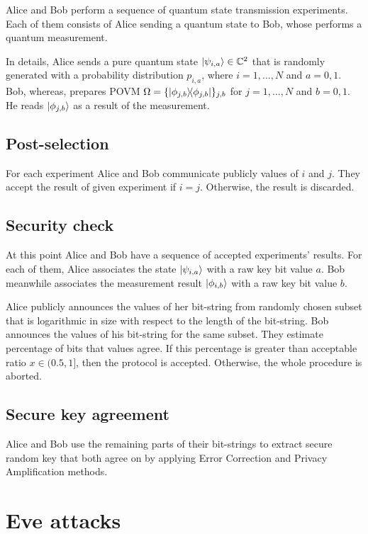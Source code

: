 \documentclass[12pt,a4paper,reqno, aps, superscriptaddress]{amsart}
\newcommand{\C}{\ensuremath{\mathbb{C}}}
\newcommand{\proj}[1]{\ensuremath{\ketbra{#1}{#1}}}
\begin{document}
Alice and Bob perform a sequence of quantum state transmission experiments. 
Each of them consists of Alice sending a quantum state to Bob, whose performs a 
quantum measurement. 

In details, Alice sends a pure quantum state $\ket{\psi_{i,a}} \in \C^2$ that 
is 
randomly generated with a probability distribution $p_{i,a}$, where 
$i=1,\ldots,N$ and $a=0,1$. Bob, whereas, prepares POVM $\Omega = 
\{\proj{\phi_{j,b}}\}_{j,b}$ for $j=1,\ldots,N$ 
and $b=0,1$. He reads $\ket{\phi_{j,b}}$ as a result of the measurement.

\subsection{Post-selection}

For each experiment Alice and Bob communicate publicly values of $i$ and $j$. 
They accept the result of given experiment if $i=j$. Otherwise, the result is 
discarded. 

\subsection{Security check}
At this point Alice and Bob have a sequence of accepted experiments' results. 
For each of them, Alice associates the state $\ket{\psi_{i,a}}$ with a raw key 
bit 
value $a$. Bob meanwhile associates the measurement result $\ket{\phi_{i,b}}$ 
with a 
raw key bit value $b$.

Alice publicly announces the values of her bit-string from randomly chosen 
subset that is logarithmic in size with respect to the length of the bit-string.
Bob announces the values of his bit-string for the same subset. They estimate 
percentage of bits that values agree. If this percentage is greater than 
acceptable 
ratio $x \in (0.5,1]$, then the protocol is accepted. Otherwise, the whole 
procedure is aborted.

\subsection{Secure key agreement}
Alice and Bob use the remaining parts of their 
bit-strings to extract secure random key that both agree on by applying Error 
Correction and Privacy Amplification methods.


\section{Eve attacks}
\end{document}
